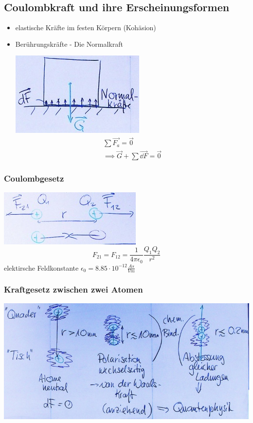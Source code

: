 \subsection{Coulombkraft und ihre Erscheinungsformen}
\begin{itemize}
	\item elastische Kräfte im festen Körpern (Kohäsion)
	\item Berührungskräfte - Die Normalkraft
		\begin{bsp*}[ note = Quader auf Tisch in Ruhe ]
			\includegraphics{Bild24}
			\begin{gather*}
				\sum \vec{F_a} = \vec{0} \\
				\implies \vec{G} + \sum \vec{\dd F} = \vec{0}
			\end{gather*}
		\end{bsp*}
\end{itemize}

\subsubsection{Coulombgesetz}
\includegraphics{Bild25}
\[ F_{21} = F_{12} = \frac{1}{4 \pi \epsilon_0} \frac{Q_1 Q_2}{r^2} \]
elektirsche Feldkonstante $\epsilon_0 = 8.85 \cdot 10^{-12} \frac{As}{Vm}$

\subsubsection{Kraftgesetz zwischen zwei Atomen}
\includegraphics{Bild26}

